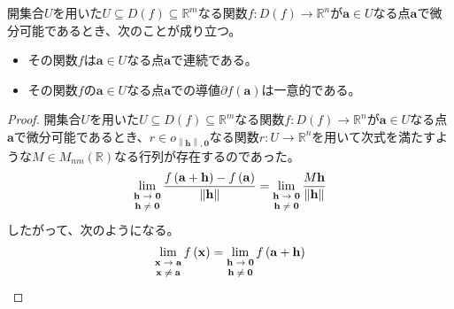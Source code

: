 \documentclass[dvipdfmx]{jsarticle}
\begin{document}
\begin{thm}\label{4.2.6.3}
開集合$U$を用いた$U \subseteq D(f) \subseteq \mathbb{R}^{m}$なる関数$f:D(f) \rightarrow \mathbb{R}^{n}$が$\mathbf{a} \in Uなる点\mathbf{a}$で微分可能であるとき、次のことが成り立つ。
\begin{itemize}
\item
  その関数$f$は$\mathbf{a} \in U$なる点$\mathbf{a}$で連続である。
\item
  その関数$f$の$\mathbf{a} \in U$なる点$\mathbf{a}$での導値$\partial f\left( \mathbf{a} \right)$は一意的である。
\end{itemize}
\end{thm}
\begin{proof}
開集合$U$を用いた$U \subseteq D(f) \subseteq \mathbb{R}^{m}$なる関数$f:D(f) \rightarrow \mathbb{R}^{n}$が$\mathbf{a} \in U$なる点$\mathbf{a}$で微分可能であるとき、$r \in o_{\left\| \mathbf{h} \right\|,\mathbf{0}}$なる関数$r:U \rightarrow \mathbb{R}^{n}$を用いて次式を満たすような$M \in M_{nm}(\mathbb{R})$なる行列が存在するのであった。
\begin{align*}
\lim_{\scriptsize \begin{matrix}
\mathbf{h} \rightarrow \mathbf{0} \\
\mathbf{h} \neq \mathbf{0} \\
\end{matrix}}\frac{f\left( \mathbf{a} + \mathbf{h} \right) - f\left( \mathbf{a} \right)}{\left\| \mathbf{h} \right\|} = \lim_{\scriptsize \begin{matrix}
\mathbf{h} \rightarrow \mathbf{0} \\
\mathbf{h} \neq \mathbf{0} \\
\end{matrix}}\frac{M\mathbf{h}}{\left\| \mathbf{h} \right\|}
\end{align*}
したがって、次のようになる。
\begin{align*}
\lim_{\scriptsize \begin{matrix}
\mathbf{x} \rightarrow \mathbf{a} \\
\mathbf{x} \neq \mathbf{a} \\
\end{matrix}}{f\left( \mathbf{x} \right)} &= \lim_{\scriptsize \begin{matrix}
\mathbf{h} \rightarrow \mathbf{0} \\
\mathbf{h} \neq \mathbf{0} \\
\end{matrix}}{f\left( \mathbf{a} + \mathbf{h} \right)}\\

\end{align*}
\end{proof}
\end{document}
